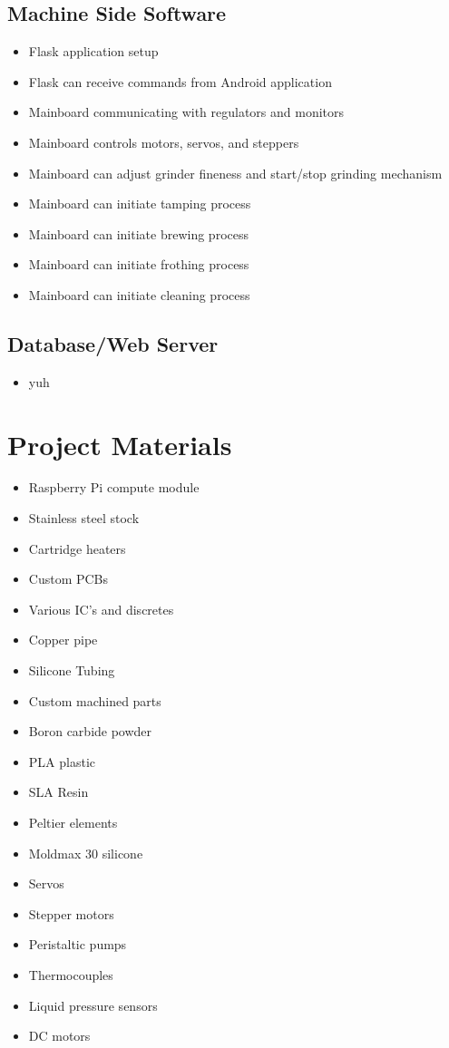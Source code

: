 \documentclass[conference]{IEEEtran}
\begin{document}
\subsection{Machine Side Software}
\begin{itemize}
  \item Flask application setup
  \item Flask can receive commands from Android application
  \item Mainboard communicating with regulators and monitors
  \item Mainboard controls motors, servos, and steppers
  \item Mainboard can adjust grinder fineness and start/stop grinding mechanism
  \item Mainboard can initiate tamping process
  \item Mainboard can initiate brewing process
  \item Mainboard can initiate frothing process
  \item Mainboard can initiate cleaning process
\end{itemize}

\subsection{Database/Web Server}
\begin{itemize}
\item yuh
\end{itemize}

\section{Project Materials}
\begin{itemize}
\item Raspberry Pi compute module
\item Stainless steel stock
\item Cartridge heaters
\item Custom PCBs
\item Various IC's and discretes %
\item Copper pipe
\item Silicone Tubing
\item Custom machined parts
\item Boron carbide powder
\item PLA plastic
\item SLA Resin
\item Peltier elements
\item Moldmax 30 silicone
\item Servos
\item Stepper motors
\item Peristaltic pumps
\item Thermocouples
\item Liquid pressure sensors
\item DC motors
\end{itemize}
\end{document}
